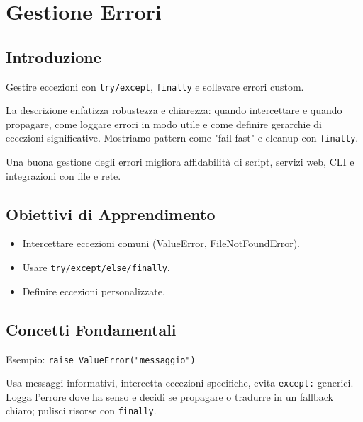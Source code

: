 \chapter{Gestione Errori}

\section{Introduzione}
Gestire eccezioni con \texttt{try/except}, \texttt{finally} e sollevare errori custom.

La descrizione enfatizza robustezza e chiarezza: quando intercettare e quando propagare, come loggare errori in modo utile e come definire gerarchie di eccezioni significative. Mostriamo pattern come "fail fast" e cleanup con \texttt{finally}.

Una buona gestione degli errori migliora affidabilità di script, servizi web, CLI e integrazioni con file e rete.

\section{Obiettivi di Apprendimento}
\begin{itemize}
  \item Intercettare eccezioni comuni (ValueError, FileNotFoundError).
  \item Usare \texttt{try/except/else/finally}.
  \item Definire eccezioni personalizzate.
\end{itemize}

\section{Concetti Fondamentali}
\begin{tcolorbox}[title=Eccezioni]
Esempio: \texttt{raise ValueError("messaggio")}
\end{tcolorbox}
\begin{tcolorbox}[title=Best practice]
Usa messaggi informativi, intercetta eccezioni specifiche, evita \texttt{except:} generici. Logga l'errore dove ha senso e decidi se propagare o tradurre in un fallback chiaro; pulisci risorse con \texttt{finally}.
\end{tcolorbox}

